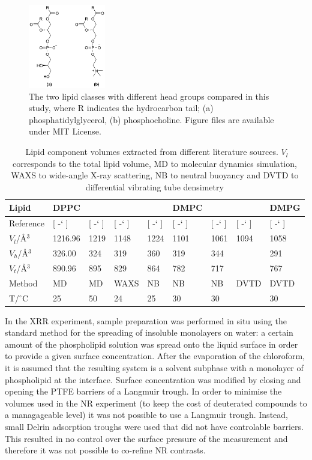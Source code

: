 \documentclass[twoside,twocolumn,9pt]{article}
\newcommand*{\citen}[1]{%
	\begingroup
	\romannumeral-`\x %
	\setcitestyle{numbers}%
	\cite{#1}%
	\endgroup   
}
\begin{document}
\begin{figure}
	\centering
	\includegraphics[width=0.30\textwidth]{figures/head_groups}
	\caption{The two lipid classes with different head groups compared in this study, where R indicates the hydrocarbon tail; (a) phosphatidylglycerol, (b) phosphocholine. Figure files are available under MIT License.\cite{mccluskey_2018}}
	\label{fig:heads}
\end{figure}

\begin{table}
	\small
	\caption{\ Lipid component volumes extracted from different literature sources. $V_l$ corresponds to the total lipid volume, MD to molecular dynamics simulation, WAXS to wide-angle X-ray scattering, NB to neutral buoyancy and DVTD to differential vibrating tube densimetry}
	\label{tab:water}
	\begin{tabular*}{\textwidth}{@{\extracolsep{\fill}}lllllllll}
		\hline 
		Lipid & DPPC & & & & DMPC & & & DMPG \\
		\hline
		Reference & [\citen{Armen1998}] & [\citen{Petrache1997}] & [\citen{Sun1994}] & [\citen{Tardieu1973}] & [\citen{Kucerka2004}] & [\citen{Nagle1978}] & [\citen{Schmidt1985}] & [\citen{Pan2012}] \\
		$V_l$/\AA$^3$ &1216.96 & 1219 & 1148 & 1224 & 1101 & 1061 & 1094 & 1058 \\
		$V_h$/\AA$^3$ & 326.00 & 324 & 319 & 360 & 319 & 344 & & 291 \\
		$V_t$/\AA$^3$ & 890.96 & 895 & 829 & 864 & 782 & 717 & & 767 \\
		Method & MD & MD & WAXS & NB & NB & NB & DVTD & DVTD \\
		T/$^\circ$C & 25 & 50 & 24 & 25 & 30 & 30 & & 30 \\
		\hline
	\end{tabular*}
\end{table}
In the XRR experiment, sample preparation was performed in situ using the standard method for the spreading of insoluble monolayers on water: a certain amount of the phospholipid solution was spread onto the liquid surface in order to provide a given surface concentration. After the evaporation of the chloroform, it is assumed that the resulting system is a solvent subphase with a monolayer of phospholipid at the interface. Surface concentration was modified by closing and opening the PTFE barriers of a Langmuir trough. In order to minimise the volumes used in the NR experiment (to keep the cost of deuterated compounds to a managageable level) it was not possible to use a Langmuir trough. Instead, small Delrin adsorption troughs were used that did not have controlable barriers. This resulted in no control over the surface pressure of the measurement and therefore it was not possible to co-refine NR contrasts. 
\end{document}
